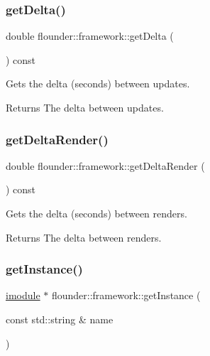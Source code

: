 \subsubsection{\texorpdfstring{get\+Delta()}{getDelta()}}
{\footnotesize\ttfamily double flounder\+::framework\+::get\+Delta (\begin{DoxyParamCaption}{ }\end{DoxyParamCaption}) const\hspace{0.3cm}{\ttfamily [inline]}}



Gets the delta (seconds) between updates. 

\begin{DoxyReturn}{Returns}
The delta between updates. 
\end{DoxyReturn}
\mbox{\label{classflounder_1_1framework_ae4020c8f9baeda03fe5ef8ceb6f1d286}} 
\subsubsection{\texorpdfstring{get\+Delta\+Render()}{getDeltaRender()}}
{\footnotesize\ttfamily double flounder\+::framework\+::get\+Delta\+Render (\begin{DoxyParamCaption}{ }\end{DoxyParamCaption}) const\hspace{0.3cm}{\ttfamily [inline]}}



Gets the delta (seconds) between renders. 

\begin{DoxyReturn}{Returns}
The delta between renders. 
\end{DoxyReturn}
\mbox{\label{classflounder_1_1framework_a84a2314d26174ab02b48bcda8fd5b4e4}} 
\subsubsection{\texorpdfstring{get\+Instance()}{getInstance()}}
{\footnotesize\ttfamily \hyperlink{classflounder_1_1imodule}{imodule} $\ast$ flounder\+::framework\+::get\+Instance (\begin{DoxyParamCaption}\item[{const std\+::string \&}]{name }\end{DoxyParamCaption})}



